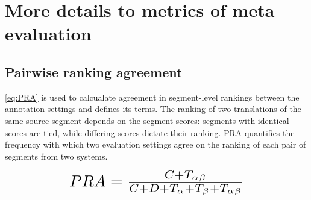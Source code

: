 \section{More details to metrics of meta evaluation}
\label{appendix:meta_eval_details}

\subsection{Pairwise ranking agreement}\label{appendix:pra_terms}

\eqref{eq:PRA} is used to calcualate agreement in segment-level rankings between the annotation settings and  defines its terms. The ranking of two translations of the same source segment depends on the segment scores: segments with identical scores are tied, while differing scores dictate their ranking. PRA quantifies the frequency with which two evaluation settings agree on the ranking of each pair of segments from two systems.

\begin{equation}
  \resizebox{0.6\hsize}{!}{$
  PRA = \frac{C + T_{\alpha\beta}}{C + D + T_\alpha + T_\beta + T_{\alpha\beta}}
  $}
  \label{eq:PRA}
\end{equation}
\vspace{-3pt}

\begin{table}[ht]
\centering
\caption{Terms in \eqref{eq:PRA}. The annotation settings are \psxsmqm, \sxsmqm, and \sxsqr.
}
\label{tab:pra_terms}
\end{table}

